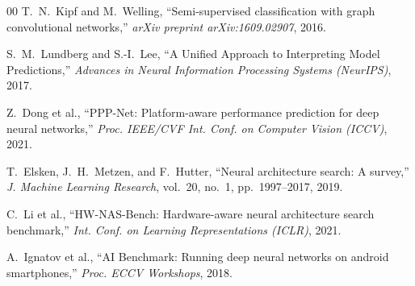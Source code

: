 \documentclass[conference]{IEEEtran}
\begin{document}
\begin{thebibliography}{00}
T.~N.~Kipf and M.~Welling,
``Semi-supervised classification with graph convolutional networks,''
\textit{arXiv preprint arXiv:1609.02907}, 2016.

S.~M.~Lundberg and S.-I.~Lee,
``A Unified Approach to Interpreting Model Predictions,''
\textit{Advances in Neural Information Processing Systems (NeurIPS)}, 2017.

Z.~Dong et al.,
``PPP-Net: Platform-aware performance prediction for deep neural networks,''
\textit{Proc. IEEE/CVF Int. Conf. on Computer Vision (ICCV)}, 2021.

T.~Elsken, J.~H.~Metzen, and F.~Hutter,
``Neural architecture search: A survey,''
\textit{J. Machine Learning Research}, vol.~20, no.~1, pp.~1997--2017, 2019.

C.~Li et al.,
``HW-NAS-Bench: Hardware-aware neural architecture search benchmark,''
\textit{Int. Conf. on Learning Representations (ICLR)}, 2021.

A.~Ignatov et al.,
``AI Benchmark: Running deep neural networks on android smartphones,''
\textit{Proc. ECCV Workshops}, 2018.

\end{thebibliography}
\end{document}
